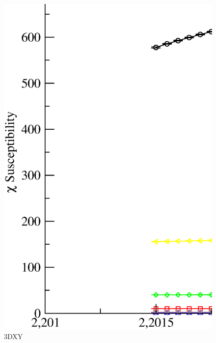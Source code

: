 \begin{figure}[!htpb]
  \centering
  \includegraphics[width=15cm]{./plots/3DXY/3DXY_Susceptibility_vs_Temperature.eps}
  \caption{3DXY}
\end{figure}


